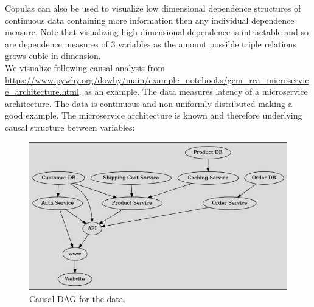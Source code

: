 \documentclass[a4paper,12pt]{article}
\begin{document}
Copulas can also be used to visualize low dimensional dependence structures of continuous data containing more
information then any individual dependence measure. Note that visualizing high dimensional dependence is
intractable and so are dependence measures of $3$ variables as the amount possible triple relations grows
cubic in dimension. \\

We visualize following causal analysis from \url{https://www.pywhy.org/dowhy/main/example_notebooks/gcm_rca_microservice_architecture.html}.
as an example. The data measures latency of a microservice architecture. The data is continuous and non-uniformly distributed making a good
example. The microservice architecture is known and therefore underlying causal structure between variables:

\begin{figure}[h]
    \centering
    \includegraphics[width=\textwidth]{../copula example/microservice_structurejpg.jpg}
    \caption{Causal DAG for the data.}
    \label{fig:../copula example/microservice_structurejpg.jpg}
\end{figure}
\end{document}
